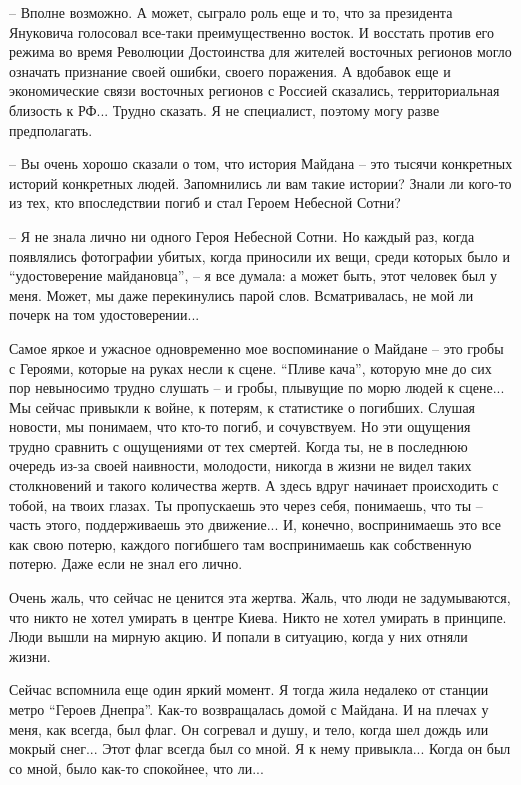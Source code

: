 – Вполне возможно. А может, сыграло роль еще и то, что за президента Януковича
голосовал все-таки преимущественно восток. И восстать против его режима во
время Революции Достоинства для жителей восточных регионов могло означать
признание своей ошибки, своего поражения. А вдобавок еще и экономические связи
восточных регионов с Россией сказались, территориальная близость к РФ... Трудно
сказать. Я не специалист, поэтому могу разве предполагать.

– Вы очень хорошо сказали о том, что история Майдана – это тысячи конкретных
историй конкретных людей. Запомнились ли вам такие истории? Знали ли кого-то из
тех, кто впоследствии погиб и стал Героем Небесной Сотни?

– Я не знала лично ни одного Героя Небесной Сотни. Но каждый раз, когда
появлялись фотографии убитых, когда приносили их вещи, среди которых было и
\enquote{удостоверение майдановца}, – я все думала: а может быть, этот человек был у
меня. Может, мы даже перекинулись парой слов. Всматривалась, не мой ли почерк
на том удостоверении...

Самое яркое и ужасное одновременно мое воспоминание о Майдане – это гробы с
Героями, которые на руках несли к сцене. \enquote{Пливе кача}, которую мне до сих пор
невыносимо трудно слушать – и гробы, плывущие по морю людей к сцене... Мы
сейчас привыкли к войне, к потерям, к статистике о погибших. Слушая новости, мы
понимаем, что кто-то погиб, и сочувствуем. Но эти ощущения трудно сравнить с
ощущениями от тех смертей. Когда ты, не в последнюю очередь из-за своей
наивности, молодости, никогда в жизни не видел таких столкновений и такого
количества жертв. А здесь вдруг начинает происходить с тобой, на твоих глазах.
Ты пропускаешь это через себя, понимаешь, что ты – часть этого, поддерживаешь
это движение... И, конечно, воспринимаешь это все как свою потерю, каждого
погибшего там воспринимаешь как собственную потерю. Даже если не знал его
лично.

Очень жаль, что сейчас не ценится эта жертва. Жаль, что люди не задумываются,
что никто не хотел умирать в центре Киева. Никто не хотел умирать в принципе.
Люди вышли на мирную акцию. И попали в ситуацию, когда у них отняли жизни.

Сейчас вспомнила еще один яркий момент. Я тогда жила недалеко от станции метро
\enquote{Героев Днепра}. Как-то возвращалась домой с Майдана. И на плечах у меня, как
всегда, был флаг. Он согревал и душу, и тело, когда шел дождь или мокрый
снег... Этот флаг всегда был со мной. Я к нему привыкла... Когда он был со
мной, было как-то спокойнее, что ли...

